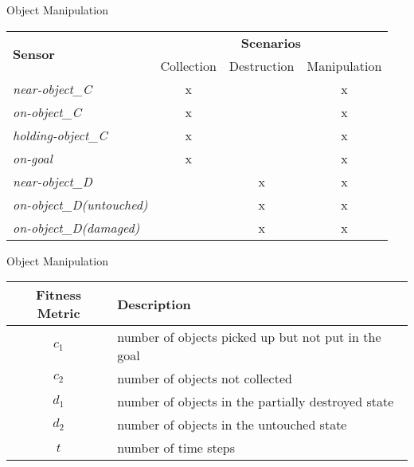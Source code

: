 
\begin{slide}{Object Manipulation}
  \centering
  \tiny
  \begin{tabular}{|l||c|c|c|}
    \hline
    \multirow{2}{*}{\textbf{Sensor}} & \multicolumn{3}{c|}{\textbf{Scenarios}}  \\
    & Collection & Destruction & Manipulation \\
    \hline
    \hline
    \emph{near-object\_C}          & x &   & x \\
    \emph{on-object\_C}            & x &   & x \\
    \emph{holding-object\_C}       & x &   & x \\
    \emph{on-goal}                 & x &   & x \\
    \hline
    \emph{near-object\_D}          &   & x & x \\
    \emph{on-object\_D(untouched)} &   & x & x \\
    \emph{on-object\_D(damaged)}   &   & x & x \\
    \hline
  \end{tabular}
\end{slide}


\begin{slide}{Object Manipulation}
  \centering
  \tiny
  \bigskip
  \begin{tabular}{c|l}
    Fitness Metric & Description \\
    \hline
    $c_{1}$ & number of objects picked up but not put in the goal   \\
    $c_{2}$ & number of objects not collected \\
    $d_{1}$ &  number of objects in the partially destroyed state  \\
    $d_{2}$ &  number of objects in the untouched state \\
    $t$         &  number of time steps \\
  \end{tabular}
\end{slide}



